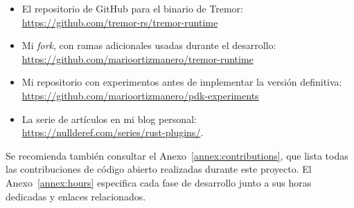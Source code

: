 \begin{itemize}
    \item El repositorio de GitHub para el binario de Tremor:\\
        \url{https://github.com/tremor-rs/tremor-runtime}
    \item Mi \emph{fork}, con ramas adicionales usadas durante el desarrollo:\\
        \url{https://github.com/marioortizmanero/tremor-runtime}
    \item Mi repositorio con experimentos antes de implementar la versión
        definitiva:\\
        \url{https://github.com/marioortizmanero/pdk-experiments}
    \item La serie de artículos en mi blog personal:\\
        \url{https://nullderef.com/series/rust-plugins/}.
\end{itemize}

Se recomienda también consultar el Anexo~\ref{annex:contributions}, que lista
todas las contribuciones de código abierto realizadas durante este proyecto. El
Anexo~\ref{annex:hours} especifica cada fase de desarrollo junto a sus horas
dedicadas y enlaces relacionados.
